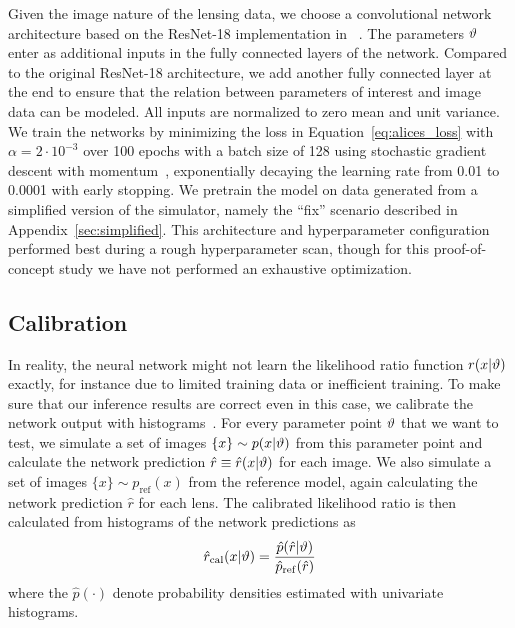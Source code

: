 \documentclass[twocolumn]{aastex63}
\begin{document}
Given the image nature of the lensing data, we choose a convolutional network architecture based on the ResNet-18 \citep{he2016deep} implementation in ~\citep{paszke2017automatic}. The parameters $\vartheta$ enter as additional inputs in the fully connected layers of the network. Compared to the original ResNet-18 architecture, we add another fully connected layer at the end to ensure that the relation between parameters of interest and image data can be modeled. All inputs are normalized to zero mean and unit variance. We train the networks by minimizing the loss in Equation~\eqref{eq:alices_loss} with $\alpha = 2 \cdot 10^{-3}$ over 100 epochs with a batch size of 128 using stochastic gradient descent with momentum~\citep{Qian:1999:MTG:307343.307376}, exponentially decaying the learning rate from 0.01 to 0.0001 with early stopping. We pretrain the model on data generated from a simplified version of the simulator, namely the ``fix'' scenario described in Appendix~\ref{sec:simplified}. This architecture and hyperparameter configuration performed best during a rough hyperparameter scan, though for this proof-of-concept study we have not performed an exhaustive optimization.

\subsection{Calibration}
\label{sec:lfi-calibration}

In reality, the neural network might not learn the likelihood ratio function $r(x|\vartheta)$ exactly, for instance due to limited training data or inefficient training. To make sure that our inference results are correct even in this case, we calibrate the network output with histograms~\citep{Cranmer:2015bka, 1805.00020}. For every parameter point $\vartheta$ that we want to test, we simulate a set of images $\{x\} \sim p(x|\vartheta)$ from this parameter point and calculate the network prediction $\hat{r} \equiv \hat{r}(x|\vartheta)$ for each image. We also simulate a set of images $\{x\} \sim p_{\mathrm{ref}}(x)$ from the reference model, again calculating the network prediction $\hat{r}$ for each lens. The calibrated likelihood ratio is then calculated from histograms of the network predictions as
%
\begin{equation}
  \hat{r}_\mathrm{cal}(x|\stattheta)
  = \frac {\hat{p}( \hat{r} | \stattheta )} {\hat{p}_\mathrm{ref}(\hat{r})}
\end{equation}
%
where the $\hat{p}(\cdot)$ denote probability densities estimated with univariate histograms.
\end{document}
